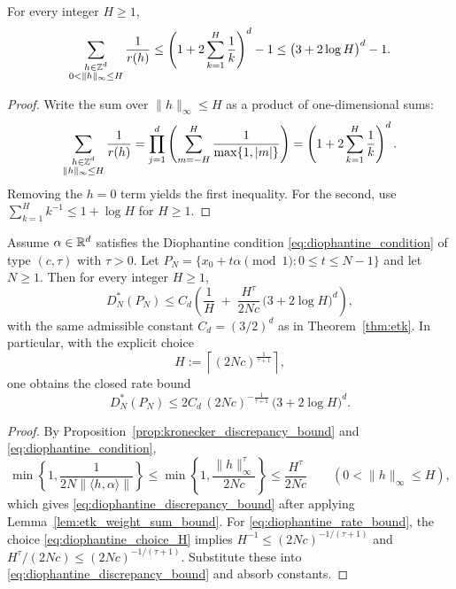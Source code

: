 \begin{lemma}
\label{lem:etk_weight_sum_bound}
For every integer $H\ge 1$,
\begin{equation}
\label{eq:etk_weight_sum_bound}
\sum_{\substack{h\in\mathbb{Z}^d\\0<\|h\|_\infty\le H}}\frac{1}{r(h)}
\le
\left(1+2\sum_{k=1}^H\frac{1}{k}\right)^d-1
\le
\big(3+2\log H\big)^d-1.
\end{equation}
\end{lemma}

\begin{proof}
Write the sum over $\|h\|_\infty\le H$ as a product of one-dimensional sums:
\[
\sum_{\substack{h\in\mathbb{Z}^d\\\|h\|_\infty\le H}}\frac{1}{r(h)}
=\prod_{j=1}^d\left(\sum_{m=-H}^H\frac{1}{\max\{1,|m|\}}\right)
=\left(1+2\sum_{k=1}^H\frac{1}{k}\right)^d.
\]
Removing the $h=0$ term yields the first inequality. For the second, use $\sum_{k=1}^H k^{-1}\le 1+\log H$ for $H\ge 1$.
\end{proof}

\begin{corollary}
\label{cor:diophantine_discrepancy_bound}
Assume $\alpha\in\mathbb{R}^d$ satisfies the Diophantine condition \eqref{eq:diophantine_condition} of type $(c,\tau)$ with $\tau>0$. Let $P_N=\{x_0+t\alpha\pmod{1}:0\le t\le N-1\}$ and let $N\ge 1$.
Then for every integer $H\ge 1$,
\begin{equation}
\label{eq:diophantine_discrepancy_bound}
D_N^\ast(P_N)
\le
C_d\left(
\frac{1}{H}
\;+\;
\frac{H^\tau}{2Nc}\,\big(3+2\log H\big)^d
\right),
\end{equation}
with the same admissible constant $C_d=(3/2)^d$ as in Theorem~\ref{thm:etk}.
In particular, with the explicit choice
\begin{equation}
\label{eq:diophantine_choice_H}
H:=\left\lceil (2Nc)^{\frac{1}{\tau+1}}\right\rceil,
\end{equation}
one obtains the closed rate bound
\begin{equation}
\label{eq:diophantine_rate_bound}
D_N^\ast(P_N)
\le
2C_d\,(2Nc)^{-\frac{1}{\tau+1}}\,\big(3+2\log H\big)^d.
\end{equation}
\end{corollary}

\begin{proof}
By Proposition~\ref{prop:kronecker_discrepancy_bound} and \eqref{eq:diophantine_condition},
\[
\min\left\{1,\frac{1}{2N\|\langle h,\alpha\rangle\|}\right\}
\le
\min\left\{1,\frac{\|h\|_\infty^\tau}{2Nc}\right\}
\le
\frac{H^\tau}{2Nc}
\qquad (0<\|h\|_\infty\le H),
\]
which gives \eqref{eq:diophantine_discrepancy_bound} after applying Lemma~\ref{lem:etk_weight_sum_bound}.
For \eqref{eq:diophantine_rate_bound}, the choice \eqref{eq:diophantine_choice_H} implies $H^{-1}\le (2Nc)^{-1/(\tau+1)}$ and $H^\tau/(2Nc)\le (2Nc)^{-1/(\tau+1)}$. Substitute these into \eqref{eq:diophantine_discrepancy_bound} and absorb constants.
\end{proof}

